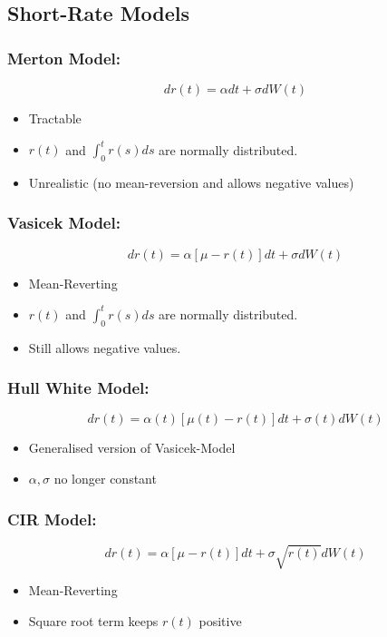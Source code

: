 \documentclass[11pt]{article}
\begin{document}
	\subsection{Short-Rate Models}
	\subsubsection{Merton Model:}
	\[	
		dr(t) = \alpha dt + \sigma dW(t)
			\]
	\begin{itemize}
		\item Tractable
		\item \( r(t) \) and \(\int_{0}^{t} r(s)ds \) are normally distributed.
		\item Unrealistic (no mean-reversion and allows negative values)
		\end{itemize}
	
	\subsubsection{Vasicek Model:}
	\[	dr(t) = \alpha \left[\mu - r(t)\right] dt + \sigma dW(t)
		\]
	\begin{itemize}
		\item Mean-Reverting
		\item \( r(t) \) and \(\int_{0}^{t} r(s)ds \) are normally distributed.
		\item Still allows negative values.
		\end{itemize}
	
	\subsubsection{Hull White Model:}
	\[	
	dr(t) = \alpha(t)\left[\mu(t) - r(t)\right]dt + \sigma(t)dW(t)
	\]
	\begin{itemize}
		\item Generalised version of Vasicek-Model
		\item \( \alpha,\sigma \) no longer constant
	\end{itemize}

	\subsubsection{CIR Model:}
	\[	dr(t) = \alpha\left[\mu - r(t)\right]dt + \sigma\sqrt{r(t)} dW(t)
		\]
		\begin{itemize}
		\item Mean-Reverting
		\item Square root term keeps \( r(t) \) positive
	\end{itemize}
\end{document}
